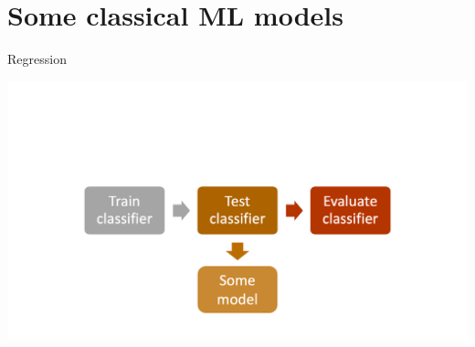 \documentclass[handout]{beamer}
\begin{document}
\section{Some classical ML models}

\begin{frame}{Regression}
	
	\begin{center}
		\includegraphics[width=\linewidth,height=\textheight,keepaspectratio]{../pictures/MLprocess_model.png} \\\
	\end{center}
	
	
	
\end{frame}
\end{document}
